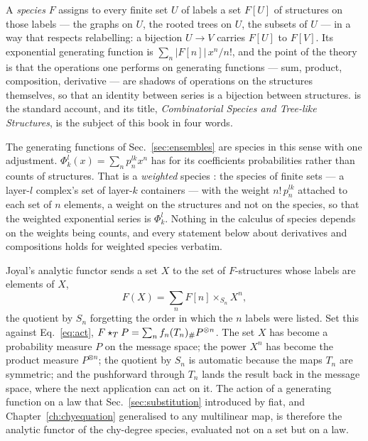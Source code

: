 A \emph{species} $F$ \citep{joyal1981} assigns to every finite set $U$ of
labels a set $F[U]$ of structures on those labels --- the graphs on $U$, the
rooted trees on $U$, the subsets of $U$ --- in a way that respects
relabelling: a bijection $U\to V$ carries $F[U]$ to $F[V]$. Its exponential
generating function is $\sum_{n}|F[n]|\,x^{n}/n!$, and the point of the
theory is that the operations one performs on generating functions --- sum,
product, composition, derivative --- are shadows of operations on the
structures themselves, so that an identity between series is a bijection
between structures. \citet{bergeron1998} is the standard account, and its
title, \emph{Combinatorial Species and Tree-like Structures}, is the subject
of this book in four words.

The generating functions of Sec.~\ref{sec:ensembles} are species in this
sense with one adjustment. $\Phi^{l}_{k}(x)=\sum_{n}p^{lk}_{n}x^{n}$ has for
its coefficients probabilities rather than counts of structures. That is a
\emph{weighted} species \citep{bergeron1998}: the species of finite
sets --- a layer-$l$ complex's set of layer-$k$ containers --- with the
weight $n!\,p^{lk}_{n}$ attached to each set of $n$ elements, a weight on
the structures and not on the species, so that the weighted exponential
series is $\Phi^{l}_{k}$. Nothing in the calculus of species
depends on the weights being counts, and every statement below about
derivatives and compositions holds for weighted species verbatim.

Joyal's analytic functor sends a set $X$ to the set of $F$-structures whose
labels are elements of $X$,
\begin{equation}
  F(X)=\sum_{n}F[n]\times_{S_{n}}X^{n},
  \label{eq:sp-analytic}
\end{equation}
the quotient by $S_{n}$ forgetting the order in which the $n$ labels were
listed. Set this against Eq.~\eqref{eq:act},
$F\star_{T}P=\sum_{n}f_{n}(T_{n})_{\#} P^{\otimes n}$. The set $X$ has become
a probability measure $P$ on the message space; the power $X^{n}$ has become
the product measure $P^{\otimes n}$; the quotient by $S_{n}$ is automatic
because the maps $T_{n}$ are symmetric; and the pushforward through $T_{n}$
lands the result back in the message space, where the next application can
act on it. The action of a generating function on a law that
Sec.~\ref{sec:substitution} introduced by fiat, and Chapter~\ref{ch:chyequation}
generalised to any multilinear map, is therefore the analytic functor of the
chy-degree species, evaluated not on a set but on a law.

